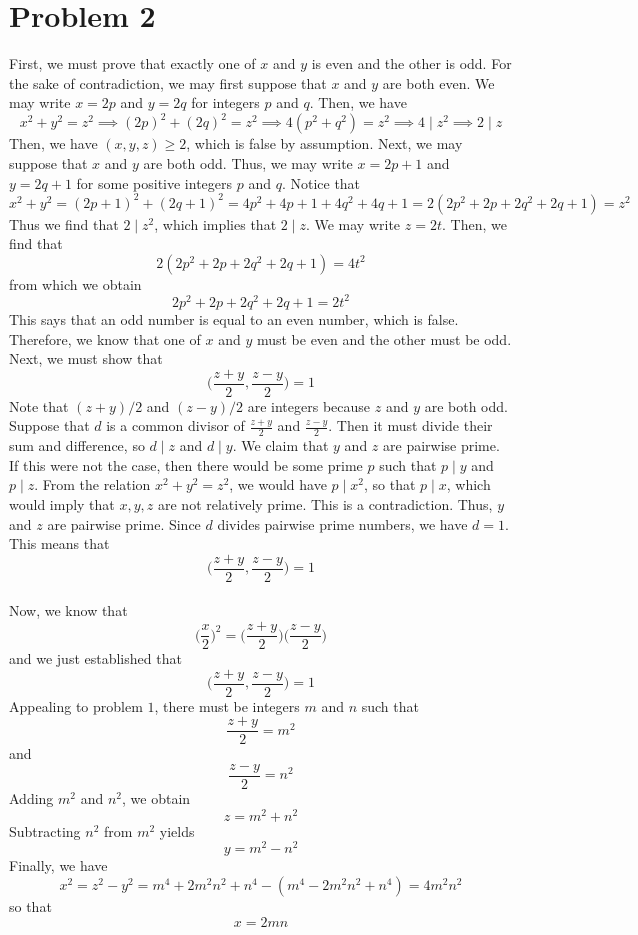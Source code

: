 \documentclass[12pt]{article}
\begin{document}
\section*{Problem 2}
First, we must prove that exactly one of $x$ and $y$ is even and the other is odd. For the sake of contradiction, we may first suppose that $x$ and $y$ are both even. We may write $x = 2p$ and $y = 2q$ for integers $p$ and $q$. Then, we have
\[
x^2 + y^2 = z^2 \implies (2p)^2 + (2q)^2 = z^2 \implies 4(p^2+q^2) = z^2 \implies 4 \mid z^2 \implies 2 \mid z
\] Then, we have $(x,y,z) \geq 2$, which is false by assumption. Next, we may suppose that $x$ and $y$ are both odd. Thus, we may write $x = 2p+1$ and $y = 2q + 1$ for some positive integers $p$ and $q$. Notice that
\[
x^2+y^2 = (2p+1)^2 + (2q+1)^2 = 4p^2 + 4p + 1 + 4q^2 + 4q + 1 = 2(2p^2+2p+2q^2+2q+1) = z^2
\] Thus we find that $2 \mid z^2$, which implies that $2 \mid z$. We may write $z = 2t$. Then, we find that
\[
2(2p^2+2p+2q^2+2q+1) = 4t^2
\] from which we obtain
\[
2p^2+2p+2q^2+2q+1 = 2t^2
\] This says that an odd number is equal to an even number, which is false. Therefore, we know that one of $x$ and $y$ must be even and the other must be odd.
\\
Next, we must show that
\[
\bigg(\frac{z+y}{2},\frac{z-y}{2}\bigg) = 1
\] Note that $(z+y)/2$ and $(z-y)/2$ are integers because $z$ and $y$ are both odd. Suppose that $d$ is a common divisor of $\frac{z+y}{2}$ and $\frac{z-y}{2}$. Then it must divide their sum and difference, so $d \mid z$ and $d \mid y$. We claim that $y$ and $z$ are pairwise prime. If this were not the case, then there would be some prime $p$ such that $p\mid y$ and $p \mid z$. From the relation $x^2+y^2 = z^2$, we would have $p \mid x^2$, so that $p \mid x$, which would imply that $x,y,z$ are not relatively prime. This is a contradiction. Thus, $y$ and $z$ are pairwise prime. Since $d$ divides pairwise prime numbers, we have $d=1$. This means that
\[
\bigg(\frac{z+y}{2},\frac{z-y}{2}\bigg) = 1
\]
\\
Now, we know that 
\[
\bigg(\frac{x}{2}\bigg)^2 = \bigg(\frac{z+y}{2}\bigg)\bigg(\frac{z-y}{2}\bigg)
\] and we just established that
\[
\bigg(\frac{z+y}{2},\frac{z-y}{2}\bigg) = 1
\] Appealing to problem $1$, there must be integers $m$ and $n$ such that
\[
\frac{z+y}{2} = m^2
\] and
\[
\frac{z-y}{2} = n^2
\] Adding $m^2$ and $n^2$, we obtain
\[
z = m^2 + n^2
\] Subtracting $n^2$ from $m^2$ yields
\[
y = m^2 - n^2
\] Finally, we have
\[
x^2 = z^2-y^2 = m^4 + 2m^2n^2 + n^4 - (m^4 - 2m^2n^2 + n^4) = 4m^2n^2 
\] so that
\[
x = 2mn
\]
\newpage
\end{document}
